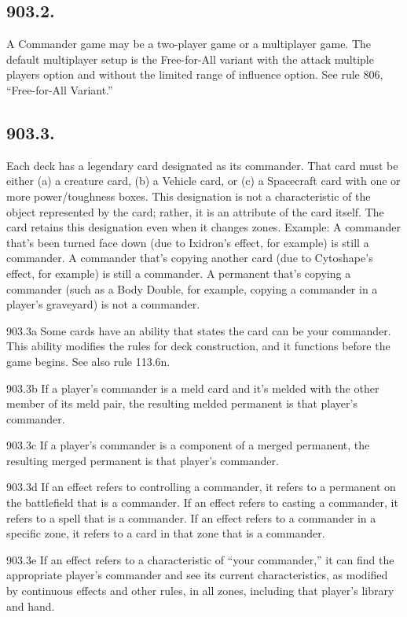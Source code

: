 \subsection*{903.2.}
A Commander game may be a two-player game or a multiplayer game. The default multiplayer setup is the Free-for-All variant with the attack multiple players option and without the limited range of influence option. See rule 806, “Free-for-All Variant.”

\subsection*{903.3.}
Each deck has a legendary card designated as its commander. That card must be either (a) a creature card, (b) a Vehicle card, or (c) a Spacecraft card with one or more power/toughness boxes. This designation is not a characteristic of the object represented by the card; rather, it is an attribute of the card itself. The card retains this designation even when it changes zones.
Example: A commander that’s been turned face down (due to Ixidron’s effect, for example) is still a commander. A commander that’s copying another card (due to Cytoshape’s effect, for example) is still a commander. A permanent that’s copying a commander (such as a Body Double, for example, copying a commander in a player’s graveyard) is not a commander.

903.3a Some cards have an ability that states the card can be your commander. This ability modifies the rules for deck construction, and it functions before the game begins. See also rule 113.6n.

903.3b If a player’s commander is a meld card and it’s melded with the other member of its meld pair, the resulting melded permanent is that player’s commander.

903.3c If a player’s commander is a component of a merged permanent, the resulting merged permanent is that player’s commander.

903.3d If an effect refers to controlling a commander, it refers to a permanent on the battlefield that is a commander. If an effect refers to casting a commander, it refers to a spell that is a commander. If an effect refers to a commander in a specific zone, it refers to a card in that zone that is a commander.

903.3e If an effect refers to a characteristic of “your commander,” it can find the appropriate player’s commander and see its current characteristics, as modified by continuous effects and other rules, in all zones, including that player’s library and hand.

